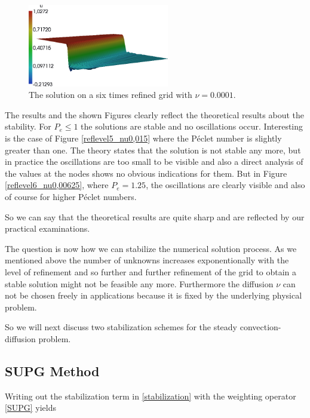 \documentclass[a4paper, 11pt, twoside]{article}
\begin{document}
\begin{figure}[htbp]
\begin{center}
\includegraphics[width=0.55\textwidth]{fig/6_0,0001.png}
\caption{The solution on a six times refined grid with $\nu = 0.0001$.}
\label{reflevel6_nu0,0001}
\end{center}
\end{figure}

The results and the shown Figures clearly reflect the theoretical results about the stability. For $P_{e} \leq 1$ the solutions are stable and no oscillations occur. Interesting is the case of Figure \ref{reflevel5_nu0,015} where the P\'{e}clet number is slightly greater than one. The theory states that the solution is not stable any more, but in practice the oscillations are too small to be visible and also a direct analysis of the values at the nodes shows no obvious indications for them. But in Figure \ref{reflevel6_nu0,00625}, where $P_{e} = 1.25$, the oscillations are clearly visible and also of course for higher P\'{e}clet numbers.

So we can say that the theoretical results are quite sharp and are reflected by our practical examinations.

The question is now how we can stabilize the numerical solution process. As we mentioned above the number of unknowns increases exponentionally with the level of refinement and so further and further refinement of the grid to obtain a stable solution might not be feasible any more. Furthermore the diffusion $\nu$ can not be chosen freely in applications because it is fixed by the underlying physical problem.

So we will next discuss two stabilization schemes for the steady convection-diffusion problem.

\subsection{SUPG Method}

Writing out the stabilization term in \eqref{stabilization} with the weighting operator \eqref{SUPG} yields
\end{document}
